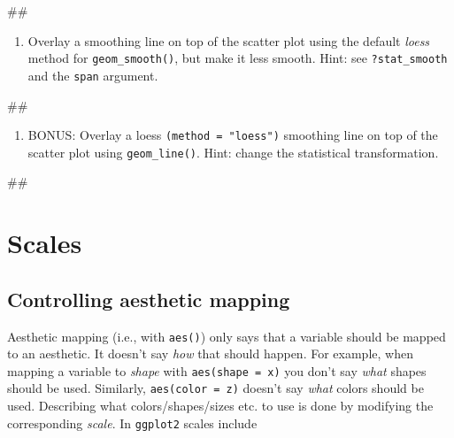 \documentclass[]{book}
\newenvironment{Shaded}{\begin{snugshade}}{\end{snugshade}}
\newcommand{\NormalTok}[1]{#1}
\providecommand{\tightlist}{%
  \setlength{\itemsep}{0pt}\setlength{\parskip}{0pt}}
\begin{document}
\begin{Shaded}
\begin{Highlighting}[]
\NormalTok{## }
\end{Highlighting}
\end{Shaded}

\begin{enumerate}
\def\labelenumi{\arabic{enumi}.}
\setcounter{enumi}{3}
\tightlist
\item
  Overlay a smoothing line on top of the scatter plot using the default
  \emph{loess} method for \texttt{geom\_smooth()}, but make it less
  smooth. Hint: see \texttt{?stat\_smooth} and the \texttt{span}
  argument.
\end{enumerate}

\begin{Shaded}
\begin{Highlighting}[]
\NormalTok{## }
\end{Highlighting}
\end{Shaded}

\begin{enumerate}
\def\labelenumi{\arabic{enumi}.}
\setcounter{enumi}{4}
\tightlist
\item
  BONUS: Overlay a loess \texttt{(method\ =\ "loess")} smoothing line on
  top of the scatter plot using \texttt{geom\_line()}. Hint: change the
  statistical transformation.
\end{enumerate}

\begin{Shaded}
\begin{Highlighting}[]
\NormalTok{## }
\end{Highlighting}
\end{Shaded}

\section{Scales}\label{scales}

\subsection{Controlling aesthetic
mapping}\label{controlling-aesthetic-mapping}

Aesthetic mapping (i.e., with \texttt{aes()}) only says that a variable
should be mapped to an aesthetic. It doesn't say \emph{how} that should
happen. For example, when mapping a variable to \emph{shape} with
\texttt{aes(shape\ =\ x)} you don't say \emph{what} shapes should be
used. Similarly, \texttt{aes(color\ =\ z)} doesn't say \emph{what}
colors should be used. Describing what colors/shapes/sizes etc. to use
is done by modifying the corresponding \emph{scale}. In \texttt{ggplot2}
scales include
\end{document}
